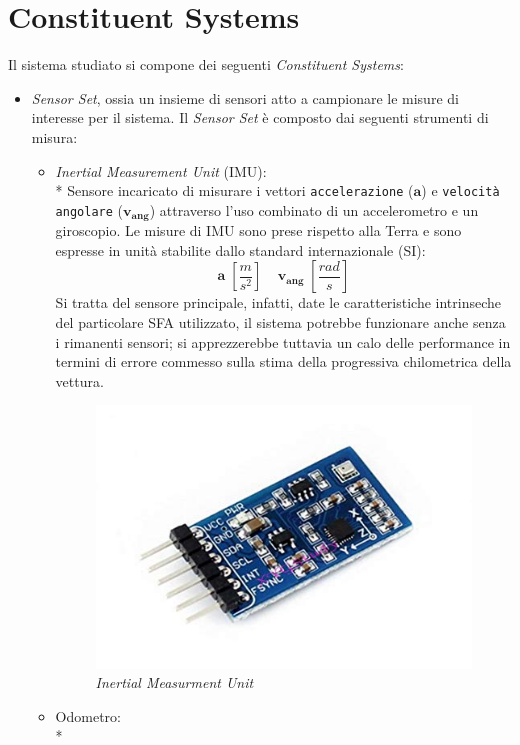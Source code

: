 \section{Constituent Systems}
Il sistema studiato si compone dei seguenti \emph{Constituent Systems}:
\begin{itemize}
	\item \emph{Sensor Set}, ossia un insieme di sensori atto a campionare le misure di interesse per il sistema. Il \emph{Sensor Set} \`e composto dai seguenti strumenti di misura:
	\begin{itemize}
		\item \emph{Inertial Measurement Unit} (IMU):\\*
		Sensore incaricato di misurare i vettori \texttt{accelerazione} ($\mathbf{a}$) e \texttt{velocit\`a angolare} ($\mathbf{v_{ang}}$) attraverso l'uso combinato di un accelerometro e un giroscopio. Le misure di IMU sono prese rispetto alla Terra e sono espresse in unit\`a stabilite dallo standard internazionale (SI):
		$$
		\mathbf{a}\;\left[\frac{m}{s^2}\right]\;\;\;\;\mathbf{v_{ang}}\;\left[ \frac{rad}{s} \right]
		$$
		Si tratta del sensore principale, infatti, date le caratteristiche intrinseche del particolare SFA utilizzato, il sistema potrebbe funzionare anche senza i rimanenti sensori; si apprezzerebbe tuttavia un calo delle performance in termini di errore commesso sulla stima della progressiva chilometrica della vettura.
		\begin{figure}[h]
			\centering
			\includegraphics[width=\linewidth]{img/imu}
			\caption{\emph{Inertial Measurment Unit}}
			\label{fig:imu}
		\end{figure}
		\item Odometro:\\*

\end{itemize}
\end{itemize}
